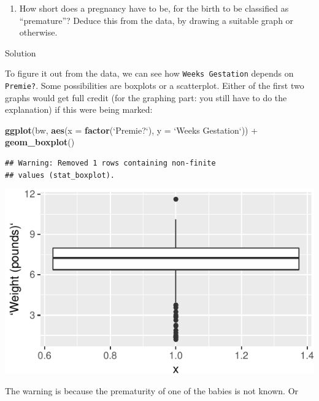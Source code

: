 \documentclass[]{tufte-book}
\newenvironment{Shaded}{}{}
\newcommand{\DataTypeTok}[1]{\textcolor[rgb]{0.56,0.13,0.00}{#1}}
\newcommand{\KeywordTok}[1]{\textcolor[rgb]{0.00,0.44,0.13}{\textbf{#1}}}
\newcommand{\NormalTok}[1]{#1}
\newcommand{\OperatorTok}[1]{\textcolor[rgb]{0.40,0.40,0.40}{#1}}
\newcommand{\StringTok}[1]{\textcolor[rgb]{0.25,0.44,0.63}{#1}}
\providecommand{\tightlist}{%
  \setlength{\itemsep}{0pt}\setlength{\parskip}{0pt}}
\theoremstyle{definition}
\theoremstyle{definition}
\theoremstyle{definition}
\theoremstyle{remark}
\begin{document}
\begin{enumerate}
\def\labelenumi{(\alph{enumi})}
\tightlist
\item
  How short does a pregnancy have to be, for the birth to be classified
  as ``premature''? Deduce this from the data, by drawing a suitable
  graph or otherwise.
\end{enumerate}

Solution

To figure it out from the data, we can see how \texttt{Weeks\ Gestation}
depends on \texttt{Premie?}. Some possibilities are boxplots or a
scatterplot. Either of the first two graphs would get full credit (for
the graphing part: you still have to do the explanation) if this were
being marked:

\begin{Shaded}
\begin{Highlighting}[]
\KeywordTok{ggplot}\NormalTok{(bw, }\KeywordTok{aes}\NormalTok{(}\DataTypeTok{x =} \KeywordTok{factor}\NormalTok{(}\StringTok{`}\DataTypeTok{Premie?}\StringTok{`}\NormalTok{), }\DataTypeTok{y =} \StringTok{`}\DataTypeTok{Weeks Gestation}\StringTok{`}\NormalTok{)) }\OperatorTok{+}\StringTok{ }
\StringTok{    }\KeywordTok{geom_boxplot}\NormalTok{()}
\end{Highlighting}
\end{Shaded}

\begin{verbatim}
## Warning: Removed 1 rows containing non-finite
## values (stat_boxplot).
\end{verbatim}

\includegraphics{03-data-summaries_files/figure-latex/unnamed-chunk-17-1}

The warning is because the prematurity of one of the babies is not
known. Or
\end{document}
